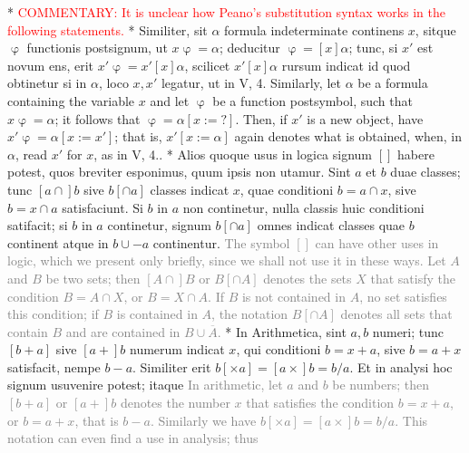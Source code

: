 \documentclass{book}
\newcommand\irrelavent[1]{\textcolor{gray}{#1}}
\newcommand\commentary[1]{\textcolor{red}{COMMENTARY: #1}}
\newenvironment{translateTwoCol}
               { %
                 \columnratio{0.5, 0.5} \begin{paracol}{2}
                 \newcommand{\LAT}{\switchcolumn[0]*}
                 \newcommand{\ENG}{\switchcolumn[1]}
               }
               { %
                 \let\ENG\undefined
                 \let\LAT\undefined
                 \end{paracol}
               }
\begin{document}
\begin{translateTwoCol}
\LAT
\ENG
\commentary{It is unclear how Peano's substitution syntax works in the following statements.} 
\LAT
Similiter, sit $\alpha$ formula indeterminate continens $x$, sitque $\upvarphi$ functionis postsignum, ut $x \upvarphi = \alpha$; deducitur $\upvarphi = [x] \alpha$; tunc, si $x'$ est novum ens, erit $x' \upvarphi = x' [x] \alpha$, scilicet $x' [x] \alpha$ rursum indicat id quod obtinetur si in $\alpha$, loco $x, x'$ legatur, ut in V, 4.
\ENG
Similarly, let $\alpha$ be a formula containing the variable $x$ and let $\upvarphi$ be a function postsymbol, such that $x\upvarphi = \alpha$; it follows that $\upvarphi = \alpha[x := ?]$. Then, if $x'$ is a new object, have $x' \upvarphi = \alpha[x := x']$; that is, $x'[x := \alpha]$ again denotes what is obtained, when, in $\alpha$, read $x'$ for $x$, as in V, 4..
\LAT
Alios quoque usus in logica signum $[ ]$ habere potest, quos breviter esponimus, quum ipsis non utamur. Sint $a$ et $b$ duae classes; tunc $[a \cap ]b$ sive $b[ \cap a]$ classes indicat $x$, quae conditioni $b = a \cap x$, sive $b = x \cap a$ satisfaciunt. Si $b$ in $a$ non continetur, nulla classis huic conditioni satifacit; si $b$ in $a$ continetur, signum $b [ \cap a ]$ omnes indicat classes quae $b$ continent atque in $b \cup - a$ continentur.
\ENG
\irrelavent{The symbol $[ ]$ can have other uses in logic, which we present only briefly, since we shall not use it in these ways. Let $A$ and $B$ be two sets; then $[A \cap ]B$ or $B[ \cap A]$ denotes the sets $X$ that satisfy the condition $B = A \cap X$, or $B = X \cap A$. If $B$ is not contained in $A$, no set satisfies this condition; if $B$ is contained in $A$, the notation $B [ \cap A ]$ denotes all sets that contain $B$ and are contained in $B \cup  \overline{A}$.} %
\LAT
In Arithmetica, sint $a, b$ numeri; tunc $[b + a]$ sive $[a +] b$ numerum indicat $x$, qui conditioni $b = x + a$, sive $b = a + x$ satisfacit, nempe $b - a$. Similiter erit $b [ \times a ] = [a \times ] b = b / a$. Et in analysi hoc signum usuvenire potest; itaque
\ENG
\irrelavent{In arithmetic, let $a$ and $b$ be numbers; then $[b + a]$ or $[a +] b$ denotes the number $x$ that satisfies the condition $b = x + a$, or $b = a + x$, that is $b - a$. Similarly we have $b [ \times a ] = [a \times ] b = b / a$. This notation can even find a use in analysis; thus} %
\end{translateTwoCol}
\end{document}

